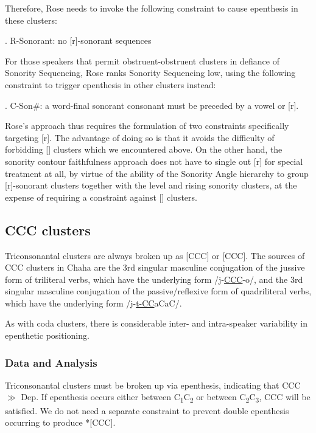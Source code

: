 \documentclass[12pt]{article}
\begin{document}
Therefore, Rose needs to invoke the following constraint to cause epenthesis in these clusters:

\ex. {\sc *R-Sonorant}: no [r]-sonorant sequences \citep[(41)]{rose.2000}

For those speakers that permit obstruent-obstruent clusters in defiance of Sonority Sequencing, Rose ranks Sonority Sequencing low, using the following constraint to trigger epenthesis in other clusters instead:

\ex. {\sc *C-Son\#}: a word-final sonorant consonant must be preceded by a vowel or [r].

Rose's approach thus requires the formulation of two constraints specifically targeting [r]. The advantage of doing so is that it avoids the difficulty of forbidding [] clusters which we encountered above. On the other hand, the sonority contour faithfulness approach does not have to single out [r] for special treatment at all, by virtue of the ability of the {\sc Sonority Angle} hierarchy to group [r]-sonorant clusters together with the level and rising sonority clusters, at the expense of requiring a constraint against [] clusters.

\subsection{CCC clusters}

Triconsonantal clusters are always broken up as [CCC] or [CCC]. The sources of CCC clusters in Chaha are the 3rd singular masculine conjugation of the jussive form of triliteral verbs, which have the underlying form /j-\underline{CCC}-o/, and
the 3rd singular masculine conjugation of the passive/reflexive form of quadriliteral verbs,
which have the underlying form /j-\underline{t-CC}aCaC/.

As with coda clusters, there is considerable inter- and intra-speaker variability in epenthetic positioning.

\subsubsection{Data and Analysis} \label{CCCanalysis}

Triconsonantal clusters must be broken up via epenthesis, indicating that {\sc *CCC} $\gg$ {\sc Dep}. If epenthesis occurs either between C\textsubscript{1}C\textsubscript{2} or between C\textsubscript{2}C\textsubscript{3}, {\sc *CCC} will be satisfied. We do not need a separate constraint to prevent double epenthesis occurring to produce *[CCC]. 
\end{document}
